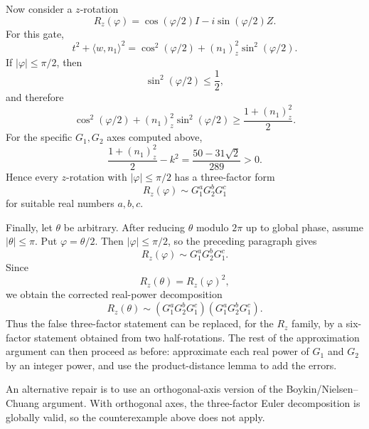 \documentclass[11pt]{article}
\newcommand{\ii}{i}
\newcommand{\Rz}{R_z}
\newcommand{\Gone}{G_1}
\newcommand{\Gtwo}{G_2}
\begin{document}
Now consider a $z$-rotation
\[
  \Rz(\varphi)=\cos(\varphi/2)I-\ii\sin(\varphi/2)Z.
\]
For this gate,
\[
  t^2+\langle w,n_1\rangle^2
  =
  \cos^2(\varphi/2)+(n_1)_z^2\sin^2(\varphi/2).
\]
If $|\varphi|\leq \pi/2$, then
\[
  \sin^2(\varphi/2)\leq \frac12,
\]
and therefore
\[
  \cos^2(\varphi/2)+(n_1)_z^2\sin^2(\varphi/2)
  \geq
  \frac{1+(n_1)_z^2}{2}.
\]
For the specific $G_1,G_2$ axes computed above,
\[
  \frac{1+(n_1)_z^2}{2}-k^2
  =
  \frac{50-31\sqrt2}{289}
  >0.
\]
Hence every $z$-rotation with $|\varphi|\leq\pi/2$ has a three-factor form
\[
  \Rz(\varphi)\sim \Gone^a\Gtwo^b\Gone^c
\]
for suitable real numbers $a,b,c$.

Finally, let $\theta$ be arbitrary.  After reducing $\theta$ modulo $2\pi$ up
to global phase, assume $|\theta|\leq\pi$.  Put $\varphi=\theta/2$.  Then
$|\varphi|\leq\pi/2$, so the preceding paragraph gives
\[
  \Rz(\varphi)\sim \Gone^a\Gtwo^b\Gone^c.
\]
Since
\[
  \Rz(\theta)=\Rz(\varphi)^2,
\]
we obtain the corrected real-power decomposition
\[
  \Rz(\theta)
  \sim
  (\Gone^a\Gtwo^b\Gone^c)(\Gone^a\Gtwo^b\Gone^c).
\]
Thus the false three-factor statement can be replaced, for the $R_z$ family,
by a six-factor statement obtained from two half-rotations.  The rest of the
approximation argument can then proceed as before: approximate each real power
of $G_1$ and $G_2$ by an integer power, and use the product-distance lemma to
add the errors.

An alternative repair is to use an orthogonal-axis version of the
Boykin/Nielsen--Chuang argument.  With orthogonal axes, the three-factor Euler
decomposition is globally valid, so the counterexample above does not apply.
\end{document}

